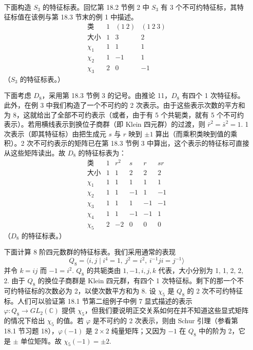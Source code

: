下面构造 \(S_3\) 的特征标表。回忆第 18.2 节例 2 中 \(S_3\) 有 3 个不可约特征标，其特征标值在该例与第 18.3 节末的例 1 中描述。
\[
\begin{array}{c|ccc}
\text{类} & 1 & (1\ 2) & (1\ 2\ 3)\\ \hline
\text{大小} & 1 & 3 & 2\\
\chi_1 & 1 & 1 & 1\\
\chi_2 & 1 & -1 & 1\\
\chi_3 & 2 & 0 & -1
\end{array}
\]
（\(S_3\) 的特征标表。）

下面考虑 \(D_8\)，采用第 18.3 节例 3 的记号。由推论 11，\(D_8\) 有四个 1 次特征标。此外，在例 3 中我们构造了一个不可约的 2 次表示。由于这些表示次数的平方和为 8，这就给出了全部不可约表示（或者，由于有 5 个共轭类，就有 5 个不可约表示）。若用横线表示到换位子商群（即 Klein 四元群）的过渡，则 \(\bar r^2 = \bar s^2 = 1\). 1 次表示（即其特征标）由把生成元 \(s\) 与 \(r\) 映到 \(\pm1\) 算出（而乘积类映到值的乘积）。2 次不可约表示的矩阵已在第 18.3 节例 3 中算出，这个表示的特征标可直接从这些矩阵读出。故 \(D_8\) 的特征标表为：
\[
\begin{array}{c|ccccc}
\text{类} & 1 & r^2 & s & r & sr\\ \hline
\text{大小} & 1 & 1 & 2 & 2 & 2\\
\chi_1 & 1 & 1 & 1 & 1 & 1\\
\chi_2 & 1 & 1 & -1 & 1 & -1\\
\chi_3 & 1 & 1 & 1 & -1 & -1\\
\chi_4 & 1 & 1 & -1 & -1 & 1\\
\chi_5 & 2 & -2 & 0 & 0 & 0
\end{array}
\]
（\(D_8\) 的特征标表。）

下面计算 8 阶四元数群的特征标表。我们采用通常的表现
\[
Q_8 = \langle i, j \mid i^4 = 1,\ j^2 = i^2,\ i^{-1}ji = j^{-1}\rangle
\]
并令 \(k = ij\) 而 \(-1 = i^2\). \(Q_8\) 的共轭类由 \(1, -1, i, j, k\) 代表，大小分别为 1, 1, 2, 2, 2. 由于 \(Q_8\) 的换位子商群是 Klein 四元群，有四个 1 次特征标。剩下的那一个不可约特征标的次数必为 2，以使次数平方和为 8. 设 \(\chi_5\) 是 \(Q_8\) 的 2 次不可约特征标。人们可以验证第 18.1 节第二组例子中例 7 显式描述的表示 \(\varphi : Q_8 \to GL_2(\mathbb{C})\) 提供 \(\chi_5\)，但我们要说明正交关系如何在并不知道这些显式矩阵的情况下给出 \(\chi_5\) 的值。若 \(\varphi\) 是不可约的 2 次表示，则由 Schur 引理（参看第 18.1 节习题 18），\(\varphi(-1)\) 是 \(2 \times 2\) 纯量矩阵；又因为 \(-1\) 在 \(Q_8\) 中的阶为 2，它是 \(\pm\) 单位矩阵。故 \(\chi_5(-1) = \pm2\).

